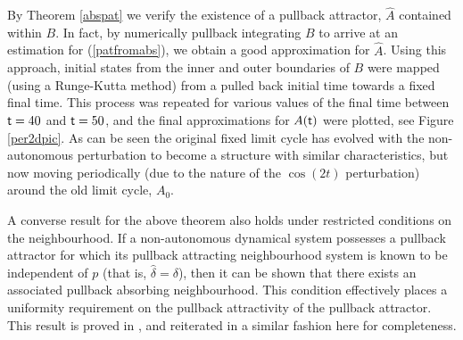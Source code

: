 \begin{eg}
  By Theorem \ref{abspat} we verify the
  existence of a pullback attractor, $\hat{A}$ contained within $B$. In fact,
  by numerically pullback integrating $B$ to arrive at an
  estimation for (\ref{patfromabs}), we obtain a good approximation for
  $\hat{A}$. Using this approach, initial states from the inner and
  outer boundaries of $B$ were mapped (using a Runge-Kutta method)
  from a pulled back initial time towards a fixed final time. This process
  was repeated for various values of the final time between $ \mathsf{\mathsf{t}} = 40$ and $ \mathsf{\mathsf{t}}
  = 50$, and the final approximations for $A( \mathsf{\mathsf{t}})$ were plotted, see Figure
  \ref{per2dpic}. As can be seen the original fixed limit cycle has
  evolved with the non-autonomous perturbation to become a structure with
  similar characteristics, but now moving periodically (due to the
  nature of the $\cos(2t)$ perturbation) around the old limit cycle, $A_0$.
\end{eg}

A converse result for the above theorem also holds under
restricted conditions on the neighbourhood. If a non-autonomous
dynamical system possesses a pullback attractor for which its
pullback attracting neighbourhood system is known to be
independent of $p$ (that is, $\hat{\delta} = \delta$), then it can
be shown that there exists an associated pullback absorbing
neighbourhood. This condition effectively places a uniformity
requirement on the pullback attractivity of the pullback
attractor. This result is proved in \cite{Kl98}, and reiterated in a
similar fashion here for completeness.

